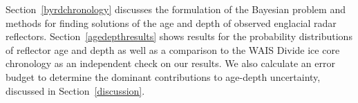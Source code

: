 

Section~\ref{byrdchronology} discusses the formulation of the Bayesian problem and methods for finding solutions of the age and depth of observed englacial radar reflectors. Section~\ref{agedepthresults} shows results for the probability distributions of reflector age and depth as well as a comparison to the WAIS Divide ice core chronology as an independent check on our results. %
We also calculate an error budget to determine the dominant contributions to age-depth uncertainty, discussed in Section~\ref{discussion}.
